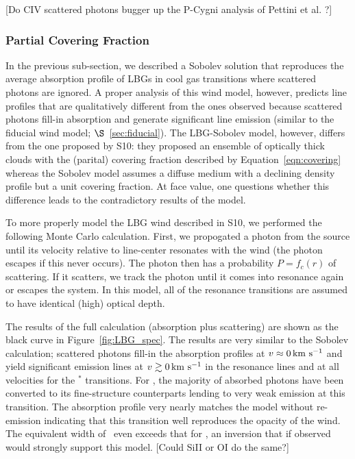 \documentclass[12pt,preprint]{aastex}
\begin{document}
[Do CIV scattered photons bugger up the P-Cygni analysis of Pettini
et al. ?]
 
\subsubsection{Partial Covering Fraction}
\label{sec:Covering}

In the previous sub-section, we described a Sobolev solution that
reproduces the average absorption profile of LBGs in cool gas
transitions where scattered photons are ignored.  A proper analysis of
this wind model, however, predicts line profiles that are qualitatively
different from the ones observed because scattered photons fill-in
absorption and generate significant line emission (similar to the
fiducial wind model; $\S$~\ref{sec:fiducial}).
The LBG-Sobolev model, however, differs from
the one proposed by S10:  they proposed an ensemble of optically
thick clouds with the (parital) covering fraction described by
Equation~\ref{eqn:covering} whereas the Sobolev model assumes
a diffuse medium with a declining density profile but a unit covering
fraction.  At face value, one questions whether this difference leads to
the contradictory results of the model. 

To more properly model the LBG wind described in S10, we 
performed the following Monte Carlo calculation.  First, we propogated
a photon from the source until its velocity relative to line-center
resonates with the wind (the photon escapes if this never occurs).
The photon then has a probability $P = f_c(r)$ of scattering.  If it
scatters, we track the photon until it comes into
resonance again or escapes the system.  In this model, all of the
resonance transitions are assumed to have identical (high) optical
depth. 

The results of the full calculation (absorption plus scattering) are
shown as the black curve in Figure~\ref{fig:LBG_spec}.  The results
are very similar to the Sobolev calculation; scattered photons fill-in
the absorption profiles at $v \approx 0 \, {\rm km~s^{-1}}$ and yield significant
emission lines at $v \gtrsim 0 \, {\rm km~s^{-1}}$ in the resonance lines and at
all velocities for the $^*$ transitions.  For \feiia,
the majority of absorbed photons have been converted to its
fine-structure counterparts lending to very weak emission at this
transition. The absorption profile very nearly matches the
model without re-emission indicating that this transition well
reproduces the opacity of the wind.  
The equivalent width of \feiia\ even exceeds that for \feiib, an
inversion that if observed would strongly support this model.
[Could SiII or OI do the same?]
\end{document}
